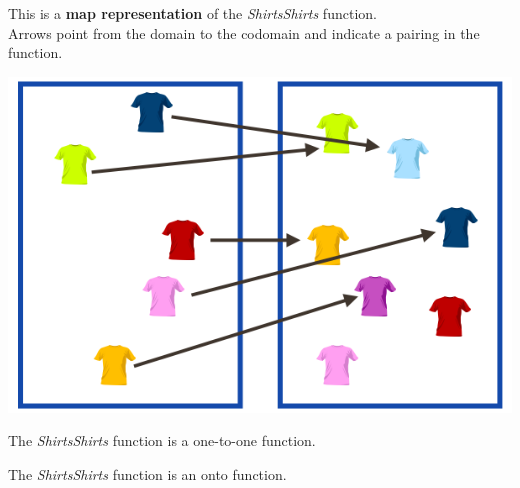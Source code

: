 \documentclass{ximera}
\author{Lee Wayand}
\begin{document}
\begin{exercise}

This is a \textbf{map representation} of the \textit{ShirtsShirts} function. \\


Arrows point from the domain to the codomain and indicate a pairing in the function.


\begin{image}
\includegraphics{../../pics/func_maps/f_6.png}
\end{image}




\begin{question} 
The \textit{ShirtsShirts} function is a one-to-one function.

\begin{multipleChoice}
\end{multipleChoice}
\end{question}







\begin{question} 
The \textit{ShirtsShirts} function is an onto function.

\begin{multipleChoice}
\end{multipleChoice}
\end{question}








\end{exercise}
\end{document}
